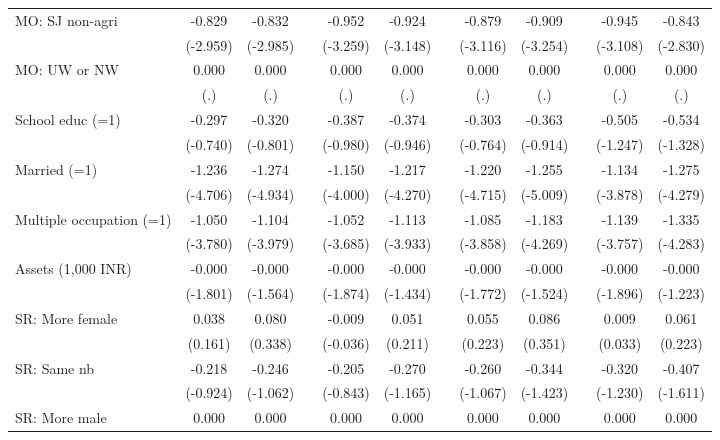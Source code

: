 {\begin{longtable}{@{\extracolsep{\fill}}lccccccccccc}
    MO: SJ non-agri & -0.829 & -0.832 &       & -0.952 & -0.924 &       & -0.879 & -0.909 &       & -0.945 & -0.843 \\
          & (-2.959) & (-2.985) &       & (-3.259) & (-3.148) &       & (-3.116) & (-3.254) &       & (-3.108) & (-2.830) \\
    MO: UW or NW & 0.000 & 0.000 &       & 0.000 & 0.000 &       & 0.000 & 0.000 &       & 0.000 & 0.000 \\
          & (.)   & (.)   &       & (.)   & (.)   &       & (.)   & (.)   &       & (.)   & (.) \\
    School educ (=1) & -0.297 & -0.320 &       & -0.387 & -0.374 &       & -0.303 & -0.363 &       & -0.505 & -0.534 \\
          & (-0.740) & (-0.801) &       & (-0.980) & (-0.946) &       & (-0.764) & (-0.914) &       & (-1.247) & (-1.328) \\
    Married (=1) & -1.236 & -1.274 &       & -1.150 & -1.217 &       & -1.220 & -1.255 &       & -1.134 & -1.275 \\
          & (-4.706) & (-4.934) &       & (-4.000) & (-4.270) &       & (-4.715) & (-5.009) &       & (-3.878) & (-4.279) \\
    Multiple occupation (=1) & -1.050 & -1.104 &       & -1.052 & -1.113 &       & -1.085 & -1.183 &       & -1.139 & -1.335 \\
          & (-3.780) & (-3.979) &       & (-3.685) & (-3.933) &       & (-3.858) & (-4.269) &       & (-3.757) & (-4.283) \\
    Assets (1,000 INR) & -0.000 & -0.000 &       & -0.000 & -0.000 &       & -0.000 & -0.000 &       & -0.000 & -0.000 \\
          & (-1.801) & (-1.564) &       & (-1.874) & (-1.434) &       & (-1.772) & (-1.524) &       & (-1.896) & (-1.223) \\
    SR: More female & 0.038 & 0.080 &       & -0.009 & 0.051 &       & 0.055 & 0.086 &       & 0.009 & 0.061 \\
          & (0.161) & (0.338) &       & (-0.036) & (0.211) &       & (0.223) & (0.351) &       & (0.033) & (0.223) \\
    SR: Same nb & -0.218 & -0.246 &       & -0.205 & -0.270 &       & -0.260 & -0.344 &       & -0.320 & -0.407 \\
          & (-0.924) & (-1.062) &       & (-0.843) & (-1.165) &       & (-1.067) & (-1.423) &       & (-1.230) & (-1.611) \\
    SR: More male & 0.000 & 0.000 &       & 0.000 & 0.000 &       & 0.000 & 0.000 &       & 0.000 & 0.000 \\

\end{longtable}}
